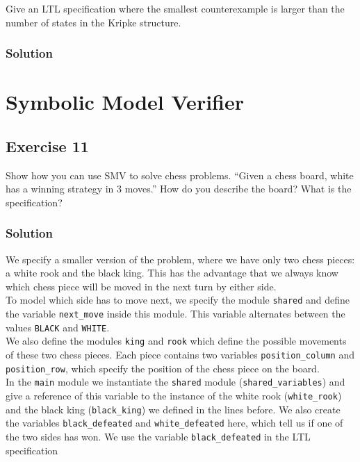 \documentclass[a4paper, 12pt]{article}
\begin{document}
Give an LTL specification where the smallest counterexample is larger than the
number of states in the Kripke structure.

\subsubsection{Solution}



\section{Symbolic Model Verifier}

\subsection{Exercise 11}

Show how you can use SMV to solve chess problems. “Given a chess board, white
has a winning strategy in 3 moves.” How do you describe the board? What is
the specification?

\subsubsection{Solution}

We specify a smaller version of the problem, where we have only two chess
pieces: a white rook and the black king. This has the advantage that we always
know which chess piece will be moved in the next turn by either side.\\

To model which side has to move next, we specify the module \texttt{shared}
and define the variable \texttt{next\_move} inside this module. This variable
alternates between the values \texttt{BLACK} and \texttt{WHITE}.\\

We also define the modules \texttt{king} and \texttt{rook} which define the
possible movements of these two chess pieces. Each piece contains two
variables \texttt{position\_column} and \texttt{position\_row}, which specify
the position of the chess piece on the board.\\

In the \texttt{main} module we instantiate the \texttt{shared} module
(\texttt{shared\_variables}) and give a reference of this variable to the
instance of the white rook (\texttt{white\_rook}) and the black king
(\texttt{black\_king}) we defined in the lines before. We also create the
variables \texttt{black\_defeated} and \texttt{white\_defeated} here, which
tell us if one of the two sides has won. We use the variable
\texttt{black\_defeated} in the LTL specification
\end{document}
